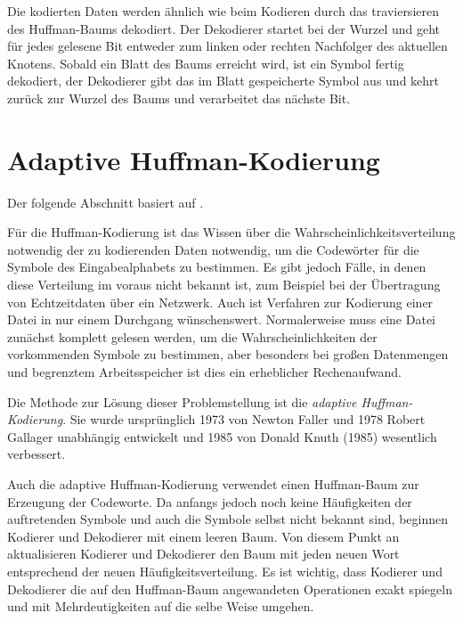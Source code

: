 \documentclass[twoside,11pt,a4paper]{article}
\theoremstyle{break}
\begin{document}
Die kodierten Daten werden ähnlich wie beim Kodieren durch das
traviersieren des Huffman-Baums dekodiert. Der Dekodierer startet bei
der Wurzel und geht für jedes gelesene Bit entweder zum linken oder
rechten Nachfolger des aktuellen Knotens. Sobald ein Blatt des Baums
erreicht wird, ist ein Symbol fertig dekodiert, der Dekodierer gibt
das im Blatt gespeicherte Symbol aus und kehrt zurück zur Wurzel des
Baums und verarbeitet das nächste Bit.



\section{Adaptive Huffman-Kodierung}
Der folgende Abschnitt basiert auf \cite{Salomon:2010}.

Für die Huffman-Kodierung ist das Wissen über die
Wahrscheinlichkeitsverteilung notwendig der zu kodierenden Daten
notwendig, um die Codewörter für die Symbole des Eingabealphabets zu
bestimmen. Es gibt jedoch Fälle, in denen diese Verteilung im voraus
nicht bekannt ist, zum Beispiel bei der Übertragung von Echtzeitdaten
über ein Netzwerk. Auch ist Verfahren zur Kodierung einer Datei in nur
einem Durchgang wünschenswert. Normalerweise muss eine Datei zunächst
komplett gelesen werden, um die Wahrscheinlichkeiten der vorkommenden
Symbole zu bestimmen, aber besonders bei großen Datenmengen und
begrenztem Arbeitsspeicher ist dies ein erheblicher Rechenaufwand.

Die Methode zur Lösung dieser Problemstellung ist die \emph{adaptive
  Huffman-Kodierung}. Sie wurde ursprünglich 1973 von Newton Faller
und 1978 Robert Gallager unabhängig entwickelt und 1985 von Donald
Knuth (1985) wesentlich verbessert.

Auch die adaptive Huffman-Kodierung verwendet einen Huffman-Baum zur
Erzeugung der Codeworte. Da anfangs jedoch noch keine Häufigkeiten der
auftretenden Symbole und auch die Symbole selbst nicht bekannt sind,
beginnen Kodierer und Dekodierer mit einem leeren Baum. Von diesem
Punkt an aktualisieren Kodierer und Dekodierer den Baum mit jeden
neuen Wort entsprechend der neuen Häufigkeitsverteilung. Es ist
wichtig, dass Kodierer und Dekodierer die auf den Huffman-Baum
angewandeten Operationen exakt spiegeln und mit Mehrdeutigkeiten auf
die selbe Weise umgehen.
\end{document}
